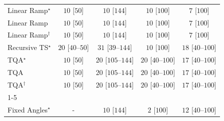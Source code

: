 \begin{tabular}{l|cccc|}
Linear Ramp$^\star$ & {\cellcolor[HTML]{F6FCF4}} \color[HTML]{000000} $10$ [$50$] & {\cellcolor[HTML]{F6FCF4}} \color[HTML]{000000} $10$ [$144$] & {\cellcolor[HTML]{F6FCF4}} \color[HTML]{000000} $10$ [$100$] & {\cellcolor[HTML]{F6FCF4}} \color[HTML]{000000} $7$ [$100$] \\
Linear Ramp & {\cellcolor[HTML]{F6FCF4}} \color[HTML]{000000} $10$ [$50$] & {\cellcolor[HTML]{F6FCF4}} \color[HTML]{000000} $10$ [$144$] & {\cellcolor[HTML]{F6FCF4}} \color[HTML]{000000} $10$ [$100$] & {\cellcolor[HTML]{F6FCF4}} \color[HTML]{000000} $7$ [$100$] \\
Linear Ramp$^\dagger$ & {\cellcolor[HTML]{F6FCF4}} \color[HTML]{000000} $10$ [$50$] & {\cellcolor[HTML]{F6FCF4}} \color[HTML]{000000} $10$ [$144$] & {\cellcolor[HTML]{F6FCF4}} \color[HTML]{000000} $10$ [$100$] & {\cellcolor[HTML]{F6FCF4}} \color[HTML]{000000} $7$ [$100$] \\
Recursive TS$^\star$ & {\cellcolor[HTML]{F4FBF2}} \color[HTML]{000000} $20$ [$40$--$50$] & {\cellcolor[HTML]{F2FAEF}} \color[HTML]{000000} $31$ [$39$--$144$] & {\cellcolor[HTML]{F6FCF4}} \color[HTML]{000000} $10$ [$100$] & {\cellcolor[HTML]{F4FBF2}} \color[HTML]{000000} $18$ [$40$--$100$] \\
TQA$^\star$ & {\cellcolor[HTML]{F6FCF4}} \color[HTML]{000000} $10$ [$50$] & {\cellcolor[HTML]{F4FBF2}} \color[HTML]{000000} $20$ [$105$--$144$] & {\cellcolor[HTML]{F4FBF2}} \color[HTML]{000000} $20$ [$40$--$100$] & {\cellcolor[HTML]{F5FBF2}} \color[HTML]{000000} $17$ [$40$--$100$] \\
TQA & {\cellcolor[HTML]{F6FCF4}} \color[HTML]{000000} $10$ [$50$] & {\cellcolor[HTML]{F4FBF2}} \color[HTML]{000000} $20$ [$105$--$144$] & {\cellcolor[HTML]{F4FBF2}} \color[HTML]{000000} $20$ [$40$--$100$] & {\cellcolor[HTML]{F5FBF2}} \color[HTML]{000000} $17$ [$40$--$100$] \\
TQA$^\dagger$ & {\cellcolor[HTML]{F6FCF4}} \color[HTML]{000000} $10$ [$50$] & {\cellcolor[HTML]{F4FBF2}} \color[HTML]{000000} $20$ [$105$--$144$] & {\cellcolor[HTML]{F4FBF2}} \color[HTML]{000000} $20$ [$40$--$100$] & {\cellcolor[HTML]{F5FBF2}} \color[HTML]{000000} $17$ [$40$--$100$] \\
\cline{1-5}
\multicolumn{5}{c}{\rule{0pt}{8pt}PP} \\
\midrule
Fixed Angles$^\star$ & {\cellcolor[HTML]{000000}} \color[HTML]{F1F1F1} {\cellcolor{white}} \color{black} - & {\cellcolor[HTML]{F6FCF4}} \color[HTML]{000000} $10$ [$144$] & {\cellcolor[HTML]{F7FCF5}} \color[HTML]{000000} $2$ [$100$] & {\cellcolor[HTML]{F5FBF3}} \color[HTML]{000000} $12$ [$40$--$100$] \\

\end{tabular}
